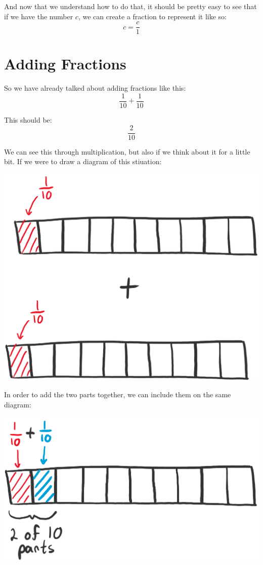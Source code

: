 \documentclass{article}
\begin{document}
And now that we understand how to do that, it should be pretty easy to see that if we have the number $c$, we can create a fraction to represent it like so: 
\[ c = \frac{c}{1} \]

\section*{Adding Fractions}
So we have already talked about adding fractions like this: 
\[ \frac{1}{10} + \frac{1}{10} \]

This should be: 
\[ \frac{2}{10} \]

We can see this through multiplication, but also if we think about it for a little bit. If we were to draw a diagram of this stiuation: 
\begin{center}
    \includegraphics[scale=0.5]{chapter5_draw3.png}
\end{center}

In order to add the two parts together, we can include them on the same diagram: 
\begin{center}
    \includegraphics[scale=0.5]{chapter5_draw4.png}
\end{center}
\end{document}
